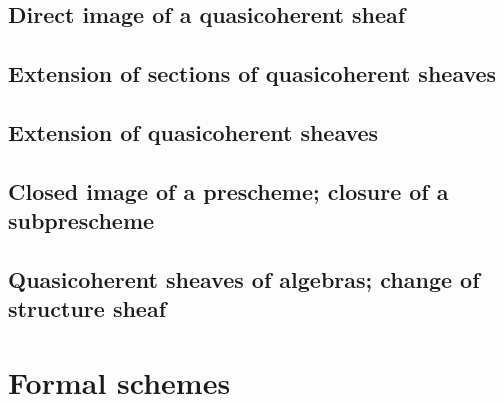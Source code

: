 \documentclass[10pt,oneside]{amsart}
\begin{document}
        \subsection{Direct image of a quasicoherent sheaf}
        
        
        \subsection{Extension of sections of quasicoherent sheaves}
        
        
        \subsection{Extension of quasicoherent sheaves}
        
        
        \subsection{Closed image of a prescheme; closure of a subprescheme}
        
        
        \subsection{Quasicoherent sheaves of algebras; change of structure sheaf}
        
        
    \section{Formal schemes}

\clearpage
\end{document}

